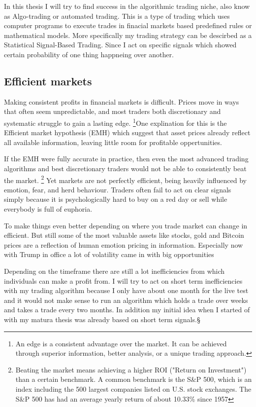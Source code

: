 \documentclass[12pt]{article}
\begin{document}
In this thesis I will try to find success in the algorithmic trading niche, also know as Algo-trading or automated trading. This is a type of trading which uses computer programs to execute trades in finacial markets based predefined rules or mathematical models.  More specifically my trading strategy can be descirbed as a Statistical Signal-Based Trading. Since I act on specific signals which showed certain probability of one thing happneing over another.



\newpage
\subsection{Efficient markets}
Making consistent profits in financial markets is difficult. Prices move in ways that often seem unpredictable, and most traders both discretionary and systematic struggle to gain a lasting edge. \footnote[1]{An edge is a consistent advantage over the market. It can be achieved through superior information, better analysis, or a unique trading approach.}One explination for this is the Efficient market hypothesis (EMH) which suggest that asset prices already reflect all available information, leaving little room for profitable oppertunities.


If the EMH were fully accurate in practice, then even the most advanced trading algorithms and best discretionary traders would not be able to consistently beat the market. \footnote[2]{Beating the market means achieving a higher ROI ("Return on Investment") than a certain benchmark. A common benchmark is the S\&P 500, which is an index including the 500 largest companies listed on U.S. stock exchanges. The S\&P 500 has had an average yearly return of about 10.33\% since 1957} Yet markets are not perfectly efficient, being heavily influenced by emotion, fear, and herd behaviour. Traders often fail to act on clear signals simply because it is psychologically hard to buy on a red day or sell while everybody is full of euphoria.


To make things even better depending on where you trade market can change in efficient. But still some of the most valuable assets like stocks, gold and Bitcoin prices are a reflection of human emotion pricing in information. Especially now with Trump in office a lot of volatility came in with big opportunities

Depending on the timeframe there are still a lot inefficiencies from which individuals can make a profit from. I will try to act on short term inefficiencies with my trading algorithm because I only have about one month for the live test and it would not make sense to run an algorithm which holds a trade over weeks and takes a trade every two months. In addition my initial idea when I started of with my matura thesis was already based on short term signals.§
\end{document}
